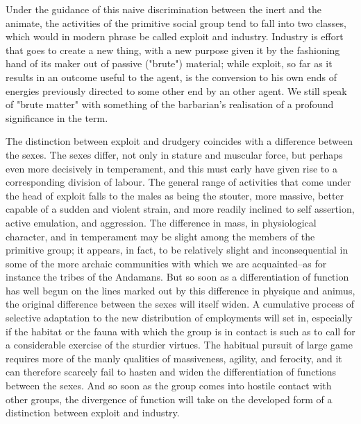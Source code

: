 \documentclass[12pt]{report}
\begin{document}
Under the guidance of this naive discrimination between the inert and
the animate, the activities of the primitive social group tend to fall
into two classes, which would in modern phrase be called exploit and
industry. Industry is effort that goes to create a new thing, with a
new purpose given it by the fashioning hand of its maker out of passive
("brute") material; while exploit, so far as it results in an outcome
useful to the agent, is the conversion to his own ends of energies
previously directed to some other end by an other agent. We still speak
of "brute matter" with something of the barbarian's realisation of a
profound significance in the term.

The distinction between exploit and drudgery coincides with a difference
between the sexes. The sexes differ, not only in stature and muscular
force, but perhaps even more decisively in temperament, and this must
early have given rise to a corresponding division of labour. The general
range of activities that come under the head of exploit falls to the
males as being the stouter, more massive, better capable of a sudden
and violent strain, and more readily inclined to self assertion, active
emulation, and aggression. The difference in mass, in physiological
character, and in temperament may be slight among the members of the
primitive group; it appears, in fact, to be relatively slight and
inconsequential in some of the more archaic communities with which we
are acquainted--as for instance the tribes of the Andamans. But so soon
as a differentiation of function has well begun on the lines marked
out by this difference in physique and animus, the original difference
between the sexes will itself widen. A cumulative process of selective
adaptation to the new distribution of employments will set in,
especially if the habitat or the fauna with which the group is in
contact is such as to call for a considerable exercise of the sturdier
virtues. The habitual pursuit of large game requires more of the manly
qualities of massiveness, agility, and ferocity, and it can therefore
scarcely fail to hasten and widen the differentiation of functions
between the sexes. And so soon as the group comes into hostile contact
with other groups, the divergence of function will take on the developed
form of a distinction between exploit and industry.
\end{document}
